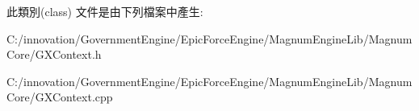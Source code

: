 此類別(class) 文件是由下列檔案中產生\+:\begin{DoxyCompactItemize}
\item 
C\+:/innovation/\+Government\+Engine/\+Epic\+Force\+Engine/\+Magnum\+Engine\+Lib/\+Magnum\+Core/G\+X\+Context.\+h\item 
C\+:/innovation/\+Government\+Engine/\+Epic\+Force\+Engine/\+Magnum\+Engine\+Lib/\+Magnum\+Core/G\+X\+Context.\+cpp\end{DoxyCompactItemize}
